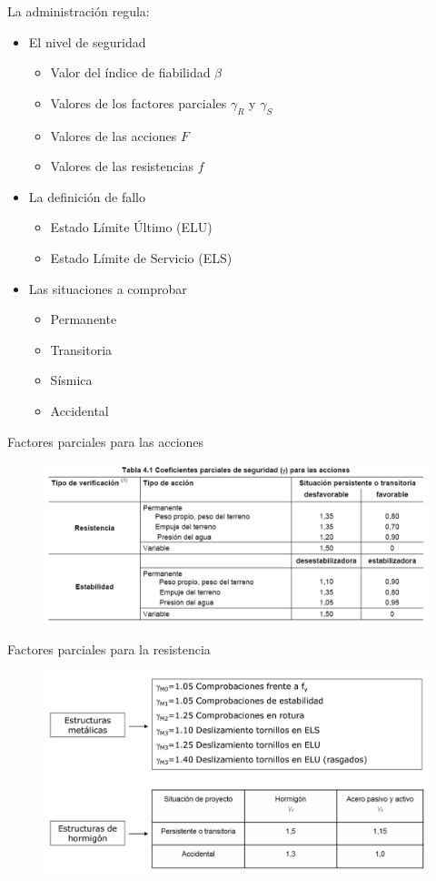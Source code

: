 La administración regula:
\begin{itemize}
    \item El nivel de seguridad
    \begin{itemize}
        \item Valor del índice de fiabilidad $\beta$
        \item Valores de los factores parciales $\gamma_R$ y $\gamma_S$
        \item Valores de las acciones $F$
        \item Valores de las resistencias $f$
    \end{itemize}
    \item La definición de fallo
    \begin{itemize}
        \item Estado Límite Último (ELU)
        \item Estado Límite de Servicio (ELS)
    \end{itemize}
    \item Las situaciones a comprobar
    \begin{itemize}
        \item Permanente
        \item Transitoria
        \item Sísmica
        \item Accidental
    \end{itemize}
\end{itemize}

Factores parciales para las acciones

\begin{figure}[H]
    \centering
    \includegraphics[width = 0.5  \textwidth]{Imagenes/Implementacion a nivel normativo - Factores parciales para las acciones.png}
\end{figure}

Factores parciales para la resistencia

\begin{figure}[H]
    \centering
    \includegraphics[width = 0.5  \textwidth]{Imagenes/Implementacion a nivel normativo - Factores parciales para la resistencia.png}
\end{figure}

